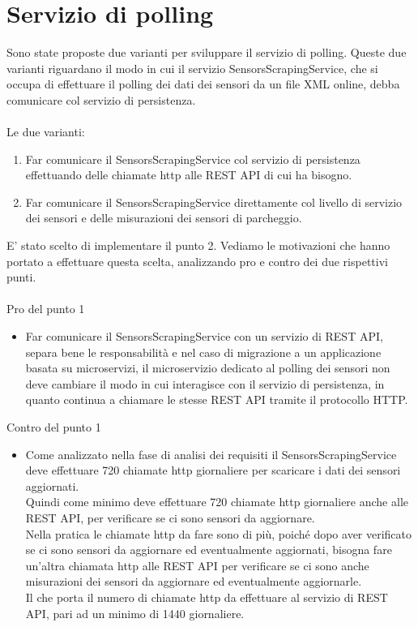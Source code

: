 \section{Servizio di polling}
Sono state proposte due varianti per sviluppare il servizio di polling. Queste due varianti riguardano il
modo in cui il servizio SensorsScrapingService, che si occupa di effettuare il polling dei dati dei sensori
da un file XML online, debba comunicare col servizio di persistenza.
\\\\
Le due varianti:
\begin{enumerate}
    \item Far comunicare il SensorsScrapingService col servizio di persistenza effettuando delle chiamate http 
        alle REST API di cui ha bisogno.
    \item Far comunicare il SensorsScrapingService direttamente col livello di servizio dei sensori e delle misurazioni 
    dei sensori di parcheggio.
\end{enumerate}
\leavevmode\newline
E' stato scelto di implementare il punto 2. Vediamo le motivazioni che hanno portato a effettuare questa scelta, analizzando pro e 
contro dei due rispettivi punti.
\\\\
Pro del punto 1
\begin{itemize}
    \item Far comunicare il SensorsScrapingService con un servizio di REST API, separa bene le responsabilità e 
        nel caso di migrazione a un applicazione basata su microservizi, il microservizio dedicato al polling dei sensori 
        non deve cambiare il modo in cui interagisce
        con il servizio di persistenza, in quanto continua a chiamare le stesse REST API tramite il protocollo HTTP.
\end{itemize}
\leavevmode\newline
Contro del punto 1
\begin{itemize}
    \item Come analizzato nella fase di analisi dei requisiti il SensorsScrapingService deve effettuare 720 chiamate http giornaliere
        per scaricare i dati dei sensori aggiornati. 
        \\
        Quindi come minimo deve effettuare 720 chiamate http giornaliere anche alle REST API, per verificare se ci sono sensori
        da aggiornare. 
        \\
        Nella pratica le chiamate http da fare sono di più, poiché dopo aver verificato se ci sono sensori da aggiornare ed
        eventualmente aggiornati, bisogna fare un'altra chiamata http alle REST API per verificare se ci sono anche misurazioni dei sensori
        da aggiornare ed eventualmente aggiornarle. 
        \\
        Il che porta il numero di chiamate http da effettuare al servizio di REST API, pari ad un minimo di 1440 giornaliere.
\end{itemize}
